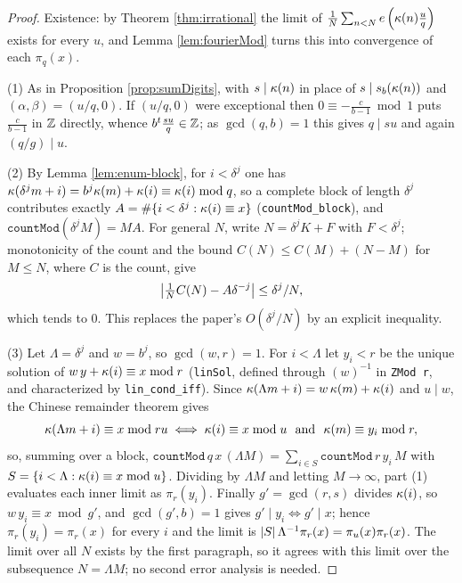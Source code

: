 \begin{proof}
  \leanok
  Existence: by Theorem \ref{thm:irrational} the limit of
  $\frac1N\sum_{n<N}e\left(\kappa(n)\frac uq\right)$ exists for every $u$, and Lemma
  \ref{lem:fourierMod} turns this into convergence of each $\pi_q(x)$.

  (1) As in Proposition \ref{prop:sumDigits}, with $s \mid \kappa(n)$ in place
  of $s \mid s_b(\kappa(n))$ and $(\alpha,\beta) = (u/q,0)$. If $(u/q,0)$ were
  exceptional then $0 \equiv -\frac{c}{b-1} \bmod 1$ puts $\frac{c}{b-1}$ in
  $\mathbb{Z}$ directly, whence $b^t\frac{su}{q} \in \mathbb{Z}$; as $\gcd(q,b)=1$ this gives
  $q \mid su$ and again $(q/g) \mid u$.

  (2) By Lemma \ref{lem:enum-block}, for $i < \delta^j$ one has
  $\kappa(\delta^jm+i) = b^j\kappa(m) + \kappa(i) \equiv \kappa(i) \bmod q$, so a
  complete block of length $\delta^j$ contributes exactly
  $A = \#\{i<\delta^j : \kappa(i) \equiv x\}$ (\texttt{countMod\_block}), and
  $\texttt{countMod}(\delta^jM) = MA$. For general $N$, write
  $N = \delta^jK + F$ with $F < \delta^j$; monotonicity of the count and the
  bound $C(N) \leq C(M) + (N-M)$ for $M \leq N$, where $C$ is the count, give
  \[
    \left\lvert  \tfrac{1}{N}C(N) - A\delta^{-j}  \right\rvert \leq \delta^j/N ,
  \]
  which tends to $0$. This replaces the paper's $O(\delta^j/N)$ by an explicit
  inequality.

  (3) Let $\Lambda = \delta^j$ and $w = b^j$, so $\gcd(w,r) = 1$. For
  $i < \Lambda$ let $y_i < r$ be the unique solution of
  $w\,y + \kappa(i) \equiv x \bmod r$ (\texttt{linSol}, defined through
  $(w)^{-1}$ in \texttt{ZMod r}, and characterized by \texttt{lin\_cond\_iff}).
  Since $\kappa(\Lambda m + i) = w\,\kappa(m) + \kappa(i)$ and $u \mid w$, the
  Chinese remainder theorem gives
  \[
    \kappa(\Lambda m+i) \equiv x \bmod ru
    \iff \kappa(i) \equiv x \bmod u \ \text{ and }\ \kappa(m) \equiv y_i \bmod r,
  \]
  so, summing over a block,
  $\texttt{countMod}\,q\,x\,(\Lambda M)
    = \sum_{i \in S} \texttt{countMod}\,r\,y_i\,M$ with
  $S = \{i<\Lambda : \kappa(i) \equiv x \bmod u\}$. Dividing by $\Lambda M$ and
  letting $M \to \infty$, part (1) evaluates each inner limit as $\pi_r(y_i)$.
  Finally $g' = \gcd(r,s)$ divides $\kappa(i)$, so
  $w\,y_i \equiv x \bmod g'$, and $\gcd(g',b) = 1$ gives
  $g' \mid y_i \iff g' \mid x$; hence $\pi_r(y_i) = \pi_r(x)$ for every $i$ and
  the limit is $\left\lvert S \right\rvert\Lambda^{-1}\pi_r(x) = \pi_u(x)\pi_r(x)$. The limit over
  all $N$ exists by the first paragraph, so it agrees with this limit over the
  subsequence $N = \Lambda M$; no second error analysis is needed.
\end{proof}

